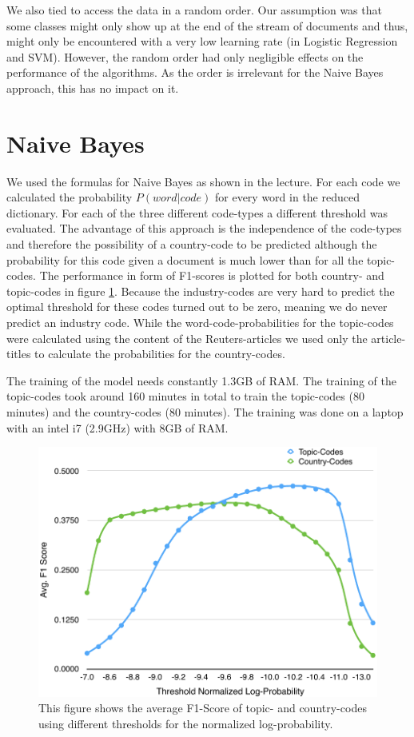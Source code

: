 \documentclass{article}
\begin{document}
We also tied to access the data in a random order. Our assumption was that some classes might only show up at the end of the stream of documents and thus, might only be encountered with a very low learning rate (in Logistic Regression and SVM).
However, the random order had only negligible effects on the performance of the algorithms. As the order is irrelevant for the Naive Bayes approach, this has no impact on it.

\section*{Naive Bayes}
We used the formulas for Naive Bayes as shown in the lecture. For each code we calculated the probability $P(word | code)$ for every word in the reduced dictionary.
For each of the three different code-types a different threshold was evaluated. The advantage of this approach is the independence of the code-types and therefore the possibility of a country-code to be predicted although the probability for this code given a document is much lower than for all the topic-codes. The performance in form of F1-scores is plotted for both country- and topic-codes in figure \ref{fig_bayesThreshold}. Because the industry-codes are very hard to predict the optimal threshold for these codes turned out to be zero, meaning we do never predict an industry code.
While the word-code-probabilities for the topic-codes were calculated using the content of the Reuters-articles we used only the article-titles to calculate the probabilities for the country-codes. 

The training of the model needs constantly 1.3GB of RAM. The training of the topic-codes took around 160 minutes in total to train the topic-codes (80 minutes) and the country-codes (80 minutes). The training was done on a laptop with an intel i7 (2.9GHz) with 8GB of RAM.

\begin{figure}[h!]
    \centering
    \includegraphics[scale=0.6]{graphics/BayesF1ScoreTopicCountry.pdf}
    \caption{This figure shows the average F1-Score of topic- and country-codes using different thresholds for the normalized log-probability.}
    \label{fig_bayesThreshold}
\end{figure}
\end{document}
